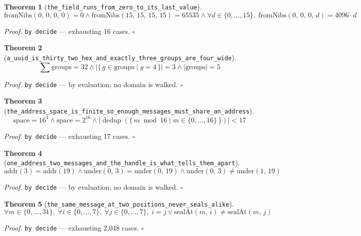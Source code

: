 \documentclass[11pt]{article}
\newtheorem{theorem}{Theorem}[section]
\begin{document}
\begin{theorem}[\texttt{the\_field\_runs\_from\_zero\_to\_its\_last\_value}]
\[ \mathrm{fromNibs}\mathopen{}\left(0,\,0,\,0,\,0\right) = 0 \land \mathrm{fromNibs}\mathopen{}\left(15,\,15,\,15,\,15\right) = 65535 \land \forall d \in \{0,\dots,15\},\; \mathrm{fromNibs}\mathopen{}\left(0,\,0,\,0,\,d\right) = 4096 \cdot d \]
\end{theorem}
\noindent\emph{Proof.} \texttt{by decide} --- exhausting 16 cases. \hfill$\square$

\begin{theorem}[\texttt{a\_uuid\_is\_thirty\_two\_hex\_and\_exactly\_three\_groups\_are\_four\_wide}]
\[ \sum \mathrm{groups} = 32 \land \left|\{\, g \in \mathrm{groups} \mid g = 4 \,\}\right| = 3 \land \left|\mathrm{groups}\right| = 5 \]
\end{theorem}
\noindent\emph{Proof.} \texttt{by decide} --- by evaluation; no domain is walked. \hfill$\square$

\begin{theorem}[\texttt{the\_address\_space\_is\_finite\_so\_enough\_messages\_must\_share\_an\_address}]
\[ \mathrm{space} = 16^{4} \land \mathrm{space} = 2^{16} \land \left|\operatorname{dedup}\left(\{\, m \bmod 16 \mid m \in \{0,\dots,16\} \,\}\right)\right| < 17 \]
\end{theorem}
\noindent\emph{Proof.} \texttt{by decide} --- exhausting 17 cases. \hfill$\square$

\begin{theorem}[\texttt{one\_address\_two\_messages\_and\_the\_handle\_is\_what\_tells\_them\_apart}]
\[ \mathrm{addr}\mathopen{}\left(3\right) = \mathrm{addr}\mathopen{}\left(19\right) \land \mathrm{under}\mathopen{}\left(0,\,3\right) = \mathrm{under}\mathopen{}\left(0,\,19\right) \land \mathrm{under}\mathopen{}\left(0,\,3\right) \neq \mathrm{under}\mathopen{}\left(1,\,19\right) \]
\end{theorem}
\noindent\emph{Proof.} \texttt{by decide} --- by evaluation; no domain is walked. \hfill$\square$

\begin{theorem}[\texttt{the\_same\_message\_at\_two\_positions\_never\_seals\_alike}]
\[ \forall m \in \{0,\dots,31\},\; \forall i \in \{0,\dots,7\},\; \forall j \in \{0,\dots,7\},\; i = j \lor \mathrm{sealAt}\mathopen{}\left(m,\,i\right) \neq \mathrm{sealAt}\mathopen{}\left(m,\,j\right) \]
\end{theorem}
\noindent\emph{Proof.} \texttt{by decide} --- exhausting 2,048 cases. \hfill$\square$
\end{document}
